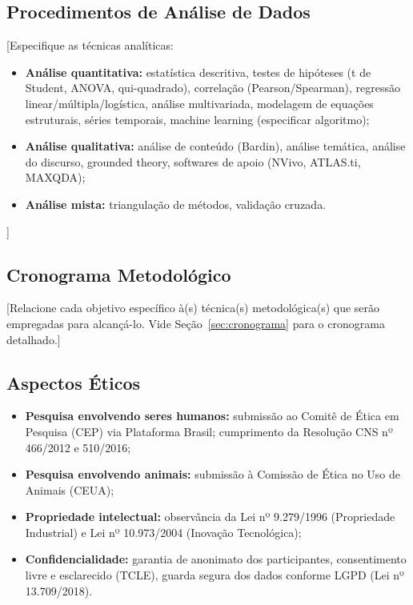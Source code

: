 \documentclass[
  12pt,
  a4paper,
  oneside,
  english,      %
  brazil
]{article}
\begin{document}
\subsection{Procedimentos de Análise de Dados}

[Especifique as técnicas analíticas:

\begin{itemize}
  \item \textbf{Análise quantitativa:} estatística descritiva,
        testes de hipóteses (t de Student, ANOVA, qui-quadrado),
        correlação (Pearson/Spearman), regressão linear/múltipla/logística,
        análise multivariada, modelagem de equações estruturais,
        séries temporais, machine learning (especificar algoritmo);
  \item \textbf{Análise qualitativa:} análise de conteúdo (Bardin),
        análise temática, análise do discurso, grounded theory,
        softwares de apoio (NVivo, ATLAS.ti, MAXQDA);
  \item \textbf{Análise mista:} triangulação de métodos,
        validação cruzada.
\end{itemize}]

\subsection{Cronograma Metodológico}

[Relacione cada objetivo específico à(s) técnica(s) metodológica(s)
que serão empregadas para alcançá-lo. Vide Seção~\ref{sec:cronograma}
para o cronograma detalhado.]

\subsection{Aspectos Éticos}

\begin{itemize}
  \item \textbf{Pesquisa envolvendo seres humanos:} submissão ao Comitê
        de Ética em Pesquisa (CEP) via Plataforma Brasil; cumprimento
        da Resolução CNS nº 466/2012 e 510/2016;
  \item \textbf{Pesquisa envolvendo animais:} submissão à Comissão de
        Ética no Uso de Animais (CEUA);
  \item \textbf{Propriedade intelectual:} observância da Lei nº
        9.279/1996 (Propriedade Industrial) e Lei nº 10.973/2004
        (Inovação Tecnológica);
  \item \textbf{Confidencialidade:} garantia de anonimato dos
        participantes, consentimento livre e esclarecido (TCLE),
        guarda segura dos dados conforme LGPD (Lei nº 13.709/2018).
\end{itemize}
\end{document}
